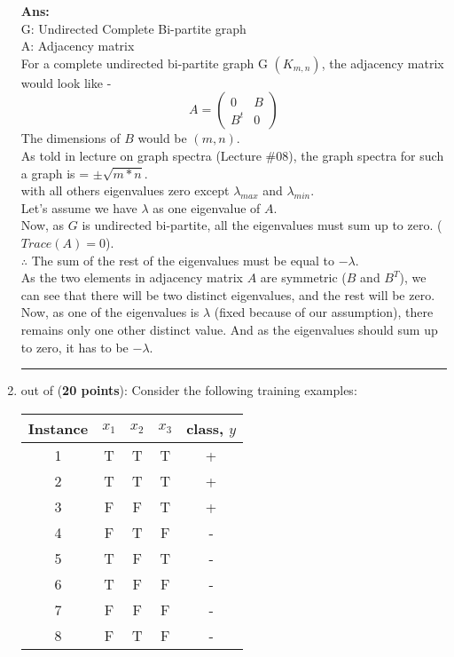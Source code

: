 \documentclass{article}%
\begin{document}
\begin{enumerate}
\textbf{Ans:}\\
G: Undirected Complete Bi-partite graph \\
A: Adjacency matrix \\
For a complete undirected bi-partite graph G $(K_{m,n})$, the adjacency matrix would look like - \\
	\[A = \left( {\begin{array}{*{20}{c}}
	0&B\\
	{{B^t}}&0
	\end{array}} \right)\]
The dimensions of $B$ would be $(m,n)$. \\

As told in lecture on graph spectra (Lecture \#08), the graph spectra for such a graph is = $ \pm \sqrt{m*n} $. \\
with all others eigenvalues zero except $\lambda_{max}$ and $\lambda_{min}$. \\

Let's assume we have $\lambda$ as one eigenvalue of $A$. \\
Now, as $G$ is undirected bi-partite, all the eigenvalues must sum up to zero. ($Trace(A) = 0$).\\
$\therefore$ The sum of the rest of the eigenvalues must be equal to $-\lambda$. \\

As the two elements in adjacency matrix $A$ are symmetric ($B$ and $B^T$), we can see that there will be two distinct eigenvalues, and the rest will be zero. \\
Now, as one of the eigenvalues is $\lambda$ (fixed because of our assumption), there remains only one other distinct value. And as the eigenvalues should sum up to zero, it has to be $-\lambda$.


\newpage

  \item \rule{0.5 in}{1 pt} out of (\textbf{20 points}): Consider the following training examples:

   \begin{center}
   \small
   \begin{tabular}{|c|ccc|c|} \hline
   Instance & $x_1$ & $x_2$ & $x_3$ & class, $y$ \\ \hline
   1 & T & T & T & + \\
   2 & T & T & T & + \\
   3 & F & F & T & + \\
   4 & F & T & F & - \\
   5 & T & F & T & - \\
   6 & T & F & F & - \\
   7 & F & F & F & - \\
   8 & F & T & F & - \\ \hline
   \end{tabular}
   \normalsize
   \end{center}


\end{enumerate}
\end{document}
